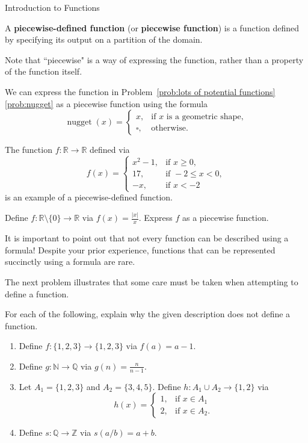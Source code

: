 \begin{section}{Introduction to Functions}
\begin{definition}
A \textbf{piecewise-defined function} (or \textbf{piecewise function}) is a function defined by specifying its output on a partition of the domain.
\end{definition}

Note that ``piecewise" is a way of expressing the function, rather than a property of the function itself.

\begin{example}
We can express the function in Problem~\ref{prob:lots of potential functions}\ref{prob:nugget} as a piecewise function using the formula
\[
\operatorname{nugget}(x)=\begin{cases}
x, & \mbox{if } x\mbox{ is a geometric shape},\\
\square, & \mbox{otherwise}.
\end{cases}
\]
\end{example}

\begin{example}
The function $f:\mathbb{R}\to \mathbb{R}$ defined via
\[
f(x)=\begin{cases}
x^2-1, & \mbox{if } x\geq 0,\\
17, & \mbox{if } -2\leq x< 0,\\
-x, & \mbox{if } x<-2
\end{cases}
\]
is an example of a piecewise-defined function.
\end{example}

\begin{problem}
Define $f:\mathbb{R}\setminus\{0\}\to \mathbb{R}$ via $f(x)=\frac{|x|}{x}$. Express $f$ as a piecewise function.
\end{problem}

It is important to point out that not every function can be described using a formula! Despite your prior experience, functions that can be represented succinctly using a formula are rare.

The next problem illustrates that some care must be taken when attempting to define a function.

\begin{problem}\label{prob:not well defined}
For each of the following, explain why the given description does not define a function.
\begin{enumerate}[label=\textrm{(\alph*)}]
\item Define $f:\{1,2,3\}\to \{1,2,3\}$ via $f(a)=a-1$.
\item Define $g:\mathbb{N}\to \mathbb{Q}$ via $g(n)=\frac{n}{n-1}$.
\item Let $A_1=\{1,2,3\}$ and $A_2=\{3,4,5\}$. Define $h:A_1\cup A_2\to \{1,2\}$ via
\[
h(x)=\begin{cases}
1, & \mbox{if }x\in A_1\\
2, & \mbox{if }x\in A_2.
\end{cases}
\]
\item Define $s:\mathbb{Q}\to \mathbb{Z}$ via $s(a/b)=a+b$.
\end{enumerate}
\end{problem}


\end{section}
